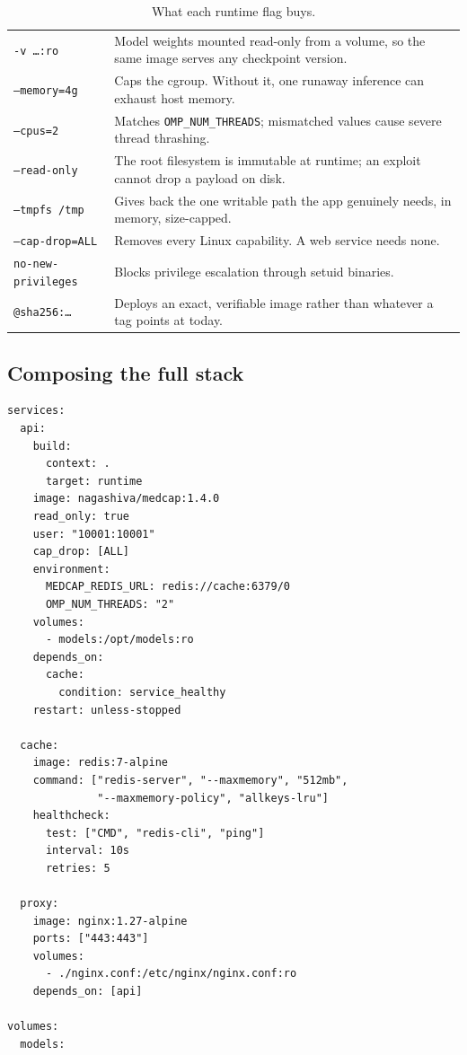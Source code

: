 \documentclass[10pt,a4paper]{article}
\begin{document}
\begin{table}[htbp]
\centering
\caption{What each runtime flag buys.}
\label{tab:runflags}
\footnotesize
\begin{tabularx}{\linewidth}{@{}l X@{}}
\toprule
\texttt{-v \ldots:ro}          & Model weights mounted read-only from a volume, so the same image serves any checkpoint version. \\
\texttt{--memory=4g}           & Caps the cgroup. Without it, one runaway inference can exhaust host memory. \\
\texttt{--cpus=2}              & Matches \texttt{OMP\_NUM\_THREADS}; mismatched values cause severe thread thrashing. \\
\texttt{--read-only}           & The root filesystem is immutable at runtime; an exploit cannot drop a payload on disk. \\
\texttt{--tmpfs /tmp}          & Gives back the one writable path the app genuinely needs, in memory, size-capped. \\
\texttt{--cap-drop=ALL}        & Removes every Linux capability. A web service needs none. \\
\texttt{no-new-privileges}     & Blocks privilege escalation through setuid binaries. \\
\texttt{@sha256:\ldots}        & Deploys an exact, verifiable image rather than whatever a tag points at today. \\
\bottomrule
\end{tabularx}
\end{table}

\subsection{Composing the full stack}

\begin{lstlisting}[style=yaml,caption={\texttt{compose.yaml} --- API, cache and reverse proxy.}]
services:
  api:
    build:
      context: .
      target: runtime
    image: nagashiva/medcap:1.4.0
    read_only: true
    user: "10001:10001"
    cap_drop: [ALL]
    environment:
      MEDCAP_REDIS_URL: redis://cache:6379/0
      OMP_NUM_THREADS: "2"
    volumes:
      - models:/opt/models:ro
    depends_on:
      cache:
        condition: service_healthy
    restart: unless-stopped

  cache:
    image: redis:7-alpine
    command: ["redis-server", "--maxmemory", "512mb",
              "--maxmemory-policy", "allkeys-lru"]
    healthcheck:
      test: ["CMD", "redis-cli", "ping"]
      interval: 10s
      retries: 5

  proxy:
    image: nginx:1.27-alpine
    ports: ["443:443"]
    volumes:
      - ./nginx.conf:/etc/nginx/nginx.conf:ro
    depends_on: [api]

volumes:
  models:
\end{lstlisting}
\end{document}
